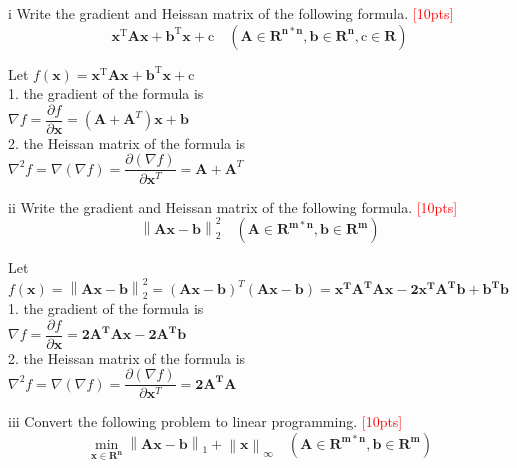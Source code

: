 \begin{center}\begin{LARGE} \end{LARGE}\end{center}

\newpage
\begin{problem}{i}
Write the gradient and Heissan matrix of the following formula.
\textcolor{red}{[10pts]}$$\mathbf{x}^{\mathrm{T}}\mathbf{Ax}+\mathbf{b}^{\mathrm{T}}\mathbf{x}+\mathrm{c}\quad(\mathbf{A}\in\mathbf{R^{n*n}}, \mathbf{b}\in\mathbf{R^{n}}, \mathrm{c}\in\mathbf{R})$$
\end{problem}

    Let $f(\mathbf{x})=\mathbf{x}^{\mathrm{T}}\mathbf{Ax}+\mathbf{b}^{\mathrm{T}}\mathbf{x}+\mathrm{c}$\\
   
    1. the gradient of the formula is\\
    $\nabla f=\dfrac{\partial f}{\partial\mathbf{x}}=(\mathbf{A+A}^T)\mathbf{x}+\mathbf{b}$\\

    2. the Heissan matrix of the formula is\\
    $\nabla^2 f=\nabla(\nabla f)=\dfrac{\partial(\nabla f)}{\partial\mathbf{x}^T}=\mathbf{A}+\mathbf{A}^T$\\

\newpage
\begin{problem}{ii}
Write the gradient and Heissan matrix of the following formula.
\textcolor{red}{[10pts]}$$\left\|\mathbf{Ax}-\mathbf{b}\right\|^{2}_{2}\quad(\mathbf{A}\in\mathbf{R^{m*n}}, \mathbf{b}\in\mathbf{R^{m}})$$
\end{problem}

    Let $f(\mathbf{x})=\left\|\mathbf{Ax}-\mathbf{b}\right\|^{2}_{2}=(\mathbf{Ax}-\mathbf{b})^T(\mathbf{Ax}-\mathbf{b})=\mathbf{x^TA^TAx}-\mathbf{2x^TA^Tb}+\mathbf{b^Tb}$\\
    1. the gradient of the formula is\\
    $\nabla f=\dfrac{\partial f}{\partial\mathbf{x}}=\mathbf{2A^TAx}-\mathbf{2A^Tb}$\\

    2. the Heissan matrix of the formula is\\
    $\nabla^2 f=\nabla(\nabla f)=\dfrac{\partial(\nabla f)}{\partial\mathbf{x}^T}=\mathbf{2A^TA}$\\

\newpage    
\begin{problem}{iii}
Convert the following problem to linear programming.
\textcolor{red}{[10pts]}$$\min_{\mathbf{x}\in\mathbf{R^{n}}}\left\|\mathbf{Ax}-\mathbf{b}\right\|_{1}+\left\|\mathbf{x}\right\|_{\infty}\quad(\mathbf{A}\in\mathbf{R^{m*n}}, \mathbf{b}\in\mathbf{R^{m}})$$
\end{problem}

